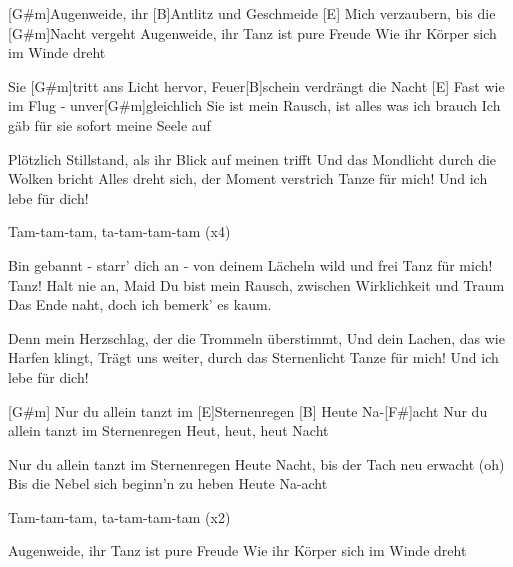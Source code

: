 

\begin{guitar}
	[G#m]Augenweide, ihr [B]Antlitz und Geschmeide
	[E] Mich verzaubern, bis die [G#m]Nacht vergeht
	Augenweide, ihr Tanz ist pure Freude
	Wie ihr Körper sich im Winde dreht
	
	Sie [G#m]tritt ans Licht hervor, Feuer[B]schein verdrängt die Nacht
	[E] Fast wie im Flug - unver[G#m]gleichlich
	Sie ist mein Rausch, ist alles was ich brauch
	Ich gäb für sie sofort meine Seele auf
	
	Plötzlich Stillstand, als ihr Blick auf meinen trifft
	Und das Mondlicht durch die Wolken bricht
	Alles dreht sich, der Moment verstrich
	Tanze für mich! Und ich lebe für dich!
	
	Tam-tam-tam, ta-tam-tam-tam (x4)
	
	 
	
	Bin gebannt - starr' dich an - von deinem Lächeln wild und frei
	Tanz für mich! Tanz! Halt nie an, Maid
	Du bist mein Rausch, zwischen Wirklichkeit und Traum
	Das Ende naht, doch ich bemerk’ es kaum.
	
	Denn mein Herzschlag, der die Trommeln überstimmt,
	Und dein Lachen, das wie Harfen klingt,
	Trägt uns weiter, durch das Sternenlicht
	Tanze für mich! Und ich lebe für dich!
	
	[G#m] Nur du allein tanzt im [E]Sternenregen
	[B] Heute Na-[F#]acht
	Nur du allein tanzt im Sternenregen
	Heut, heut, heut Nacht
	
	Nur du allein tanzt im Sternenregen
	Heute Nacht, bis der Tach neu erwacht (oh)
	Bis die Nebel sich beginn'n zu heben
	Heute Na-acht
	
	 
	
	Tam-tam-tam, ta-tam-tam-tam (x2)
	
	Augenweide, ihr Tanz ist pure Freude
	Wie ihr Körper sich im Winde dreht
\end{guitar}